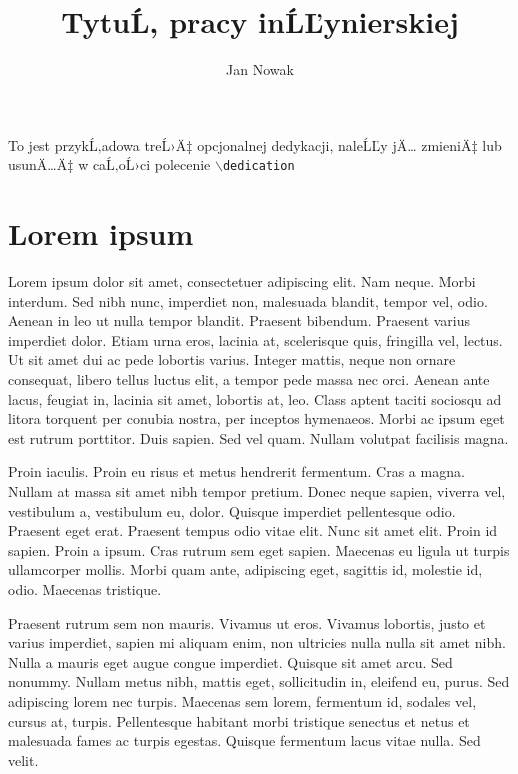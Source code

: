 \documentclass[eng,printmode]{mgr}
\title{TytuĹ‚ pracy inĹĽynierskiej}
\author{Jan Nowak}
\begin{document}

\maketitle %
\dedication{6cm}{To jest przykĹ‚adowa treĹ›Ä‡ opcjonalnej dedykacji, naleĹĽy jÄ… zmieniÄ‡ lub usunÄ…Ä‡ w caĹ‚oĹ›ci polecenie \texttt{$\backslash$dedication}}

\tableofcontents %

\chapter{Lorem ipsum}
Lorem ipsum dolor sit amet, consectetuer adipiscing elit. Nam neque. Morbi interdum. Sed nibh nunc, imperdiet non, malesuada blandit, tempor vel, odio. Aenean in leo ut nulla tempor blandit. Praesent bibendum. Praesent varius imperdiet dolor. Etiam urna eros, lacinia at, scelerisque quis, fringilla vel, lectus. Ut sit amet dui ac pede lobortis varius. Integer mattis, neque non ornare consequat, libero tellus luctus elit, a tempor pede massa nec orci. Aenean ante lacus, feugiat in, lacinia sit amet, lobortis at, leo. Class aptent taciti sociosqu ad litora torquent per conubia nostra, per inceptos hymenaeos. Morbi ac ipsum eget est rutrum porttitor. Duis sapien. Sed vel quam. Nullam volutpat facilisis magna. 

Proin iaculis. Proin eu risus et metus hendrerit fermentum. Cras a magna. Nullam at massa sit amet nibh tempor pretium. Donec neque sapien, viverra vel, vestibulum a, vestibulum eu, dolor. Quisque imperdiet pellentesque odio. Praesent eget erat. Praesent tempus odio vitae elit. Nunc sit amet elit. Proin id sapien. Proin a ipsum. Cras rutrum sem eget sapien. Maecenas eu ligula ut turpis ullamcorper mollis. Morbi quam ante, adipiscing eget, sagittis id, molestie id, odio. Maecenas tristique. 

Praesent rutrum sem non mauris. Vivamus ut eros. Vivamus lobortis, justo et varius imperdiet, sapien mi aliquam enim, non ultricies nulla nulla sit amet nibh. Nulla a mauris eget augue congue imperdiet. Quisque sit amet arcu. Sed nonummy. Nullam metus nibh, mattis eget, sollicitudin in, eleifend eu, purus. Sed adipiscing lorem nec turpis. Maecenas sem lorem, fermentum id, sodales vel, cursus at, turpis. Pellentesque habitant morbi tristique senectus et netus et malesuada fames ac turpis egestas. Quisque fermentum lacus vitae nulla. Sed velit. 
\end{document}
